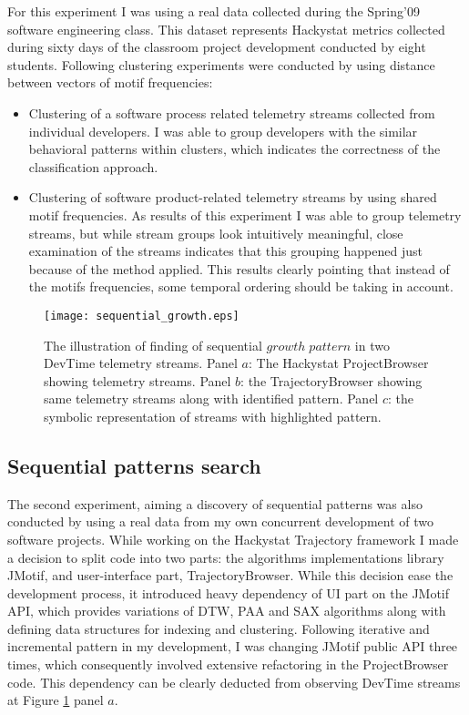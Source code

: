 For this experiment I was using a real data collected during the Spring'09 software engineering class. This dataset represents Hackystat metrics collected during sixty days of the classroom project development conducted by eight students. Following clustering experiments were conducted by using distance between vectors of motif frequencies:
\begin{itemize}
	\item Clustering of a software process related telemetry streams collected from individual developers. I was able to group developers with the similar behavioral patterns within clusters, which indicates the correctness of the classification approach.
	\item Clustering of software product-related telemetry streams by using shared motif frequencies. As results of this experiment I was able to group telemetry streams, but while stream groups look intuitively meaningful, close examination of the streams indicates that this grouping happened just because of the method applied. This results clearly pointing that instead of the motifs frequencies, some temporal ordering should be taking in account.
\end{itemize}

\begin{figure}[tbp]
   \centering
   \texttt{[image: sequential\_growth.eps]}
   \caption{The illustration of finding of sequential $growth \; pattern$ in two DevTime telemetry streams. Panel $a$: The Hackystat ProjectBrowser showing telemetry streams. Panel $b$: the TrajectoryBrowser showing same telemetry streams along with identified pattern. Panel $c$: the symbolic representation of streams with highlighted pattern.}
   \label{fig:sequential_growth}
\end{figure}

\subsection{Sequential patterns search}
The second experiment, aiming a discovery of sequential patterns was also conducted by using a real data from my own concurrent development of two software projects. While working on the Hackystat Trajectory framework I made a decision to split code into two parts: the algorithms implementations library JMotif, and user-interface part, TrajectoryBrowser. While this decision ease the development process, it introduced heavy dependency of UI part on the JMotif API, which provides variations of DTW, PAA and SAX algorithms along with defining data structures for indexing and clustering. Following iterative and incremental pattern in my development, I was changing JMotif public API three times, which consequently involved extensive refactoring in the ProjectBrowser code. This dependency can be clearly deducted from observing DevTime streams at Figure \ref{fig:sequential_growth} panel $a$. 

